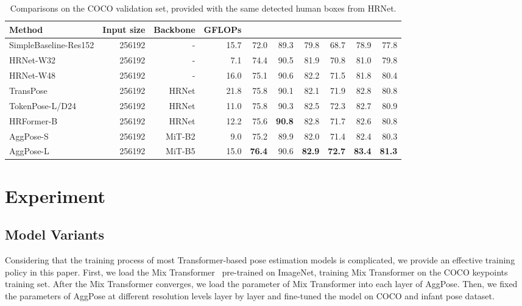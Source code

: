 \documentclass{article}
\begin{document}
\begin{table*}
\centering
\begin{tabular}{lrrrrrrrrr}
\toprule
Method    & Input size  & Backbone    & GFLOPs    &   &  &  &  &    &  \\
\midrule
SimpleBaseline-Res152   & 256192    & -  & 15.7  & 72.0  &  89.3  & 79.8  &  68.7  & 78.9  & 77.8   \\
HRNet-W32~\cite{wang2020deep}   & 256192    & -  & 7.1  & 74.4  &  90.5  &  81.9  & 70.8   & 81.0  &  79.8   \\
HRNet-W48~\cite{wang2020deep}   & 256192    & -  & 16.0  &  75.1  &  90.6  &  82.2  &  71.5  &  81.8  &  80.4     \\
TransPose~\cite{yang2021transpose}  & 256192  & HRNet   & 21.8    & 75.8 & 90.1  & 82.1  & 71.9  & 82.8  & 80.8      \\
TokenPose-L/D24~\cite{li2021tokenpose}  & 256192    & HRNet  & 11.0  & 75.8  & 90.3 &  82.5  & 72.3  &  82.7  & 80.9   \\
HRFormer-B~\cite{yuan2021hrformer}  & 256192    & HRNet  & 12.2  & 75.6  & \textbf{90.8}  & 82.8  & 71.7  & 82.6  & 80.8    \\
AggPose-S  & 256192 & MiT-B2  & 9.0   & 75.2  & 89.9  &  82.0  &  71.4  &  82.4   &  80.3     \\
AggPose-L  & 256192 & MiT-B5  & 15.0    & \textbf{76.4}  & 90.6  & \textbf{82.9}  & \textbf{72.7}   & \textbf{83.4}   & \textbf{81.3}\\
\bottomrule
\end{tabular}
\caption{Comparisons on the COCO validation set, provided with the same detected human boxes from HRNet.}
\label{tab:COCO_comparison}
\end{table*}

\section{Experiment}

\subsection{Model Variants}

Considering that the training process of most Transformer-based pose estimation models is complicated, we provide an effective training policy in this paper. First, we load the Mix Transformer~\cite{xie2021segformer} pre-trained on ImageNet, training Mix Transformer on the COCO keypoints training set. After the Mix Transformer converges, we load the parameter of Mix Transformer into each layer of AggPose. Then, we fixed the parameters of AggPose at different resolution levels layer by layer and fine-tuned the model on COCO and infant pose dataset. 
\end{document}
